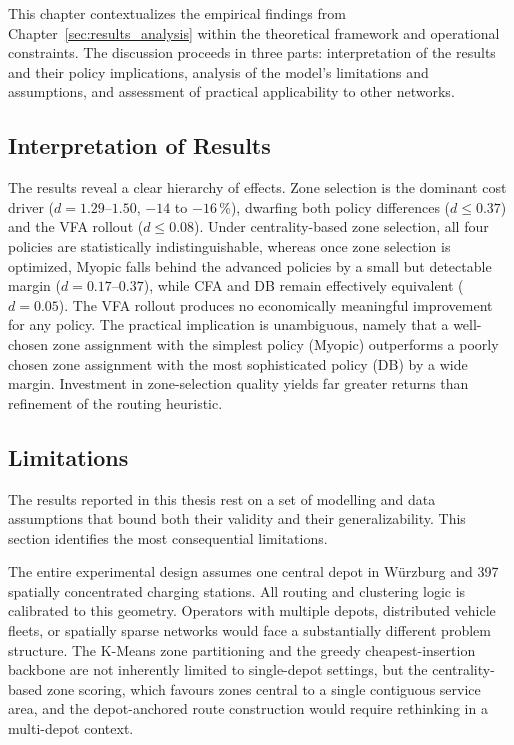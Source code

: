 \documentclass[12pt,oneside]{article}
\begin{document}
This chapter contextualizes the empirical findings from Chapter~\ref{sec:results_analysis} within the theoretical framework and operational constraints. The discussion proceeds in three parts: interpretation of the results and their policy implications, analysis of the model's limitations and assumptions, and assessment of practical applicability to other networks.

\subsection{Interpretation of Results}\label{subsec_interpretation_of_results}

The results reveal a clear hierarchy of effects. Zone selection is the dominant cost driver ($d = 1.29$--$1.50$, $-14$ to $-16$\,\%), dwarfing both policy differences ($d \leq 0.37$) and the VFA rollout ($d \leq 0.08$). Under centrality-based zone selection, all four policies are statistically indistinguishable, whereas once zone selection is optimized, Myopic falls behind the advanced policies by a small but detectable margin ($d = 0.17$--$0.37$), while CFA and DB remain effectively equivalent ($d = 0.05$). The VFA rollout produces no economically meaningful improvement for any policy. The practical implication is unambiguous, namely that a well-chosen zone assignment with the simplest policy (Myopic) outperforms a poorly chosen zone assignment with the most sophisticated policy (DB) by a wide margin. Investment in zone-selection quality yields far greater returns than refinement of the routing heuristic.

\subsection{Limitations}\label{subsec:limitations}

The results reported in this thesis rest on a set of modelling and data assumptions that bound both their validity and their generalizability. This section identifies the most consequential limitations.

The entire experimental design assumes one central depot in Würzburg and 397 spatially concentrated charging stations. All routing and clustering logic is calibrated to this geometry. Operators with multiple depots, distributed vehicle fleets, or spatially sparse networks would face a substantially different problem structure. The K-Means zone partitioning and the greedy cheapest-insertion backbone are not inherently limited to single-depot settings, but the centrality-based zone scoring, which favours zones central to a single contiguous service area, and the depot-anchored route construction would require rethinking in a multi-depot context.
\end{document}

